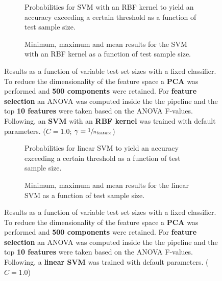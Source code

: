 \begin{figure}
    \captionsetup[subfigure]{justification=justified,singlelinecheck=false}
    \begin{subfigure}[t]{0.61\textwidth}
        
        \caption{Probabilities for SVM with an RBF kernel to yield an accuracy exceeding a certain threshold as a function of test sample size.}
    \end{subfigure}
    \hspace{3.0mm}
    \begin{subfigure}[t]{0.34\textwidth}
        
        \caption{Minimum, maximum and mean results for the SVM with an RBF kernel as a function of test sample size.}
    \end{subfigure}
    \caption[Effects of varying test sample size. SVM (kernel = RBF); Preprocessing: PCA ($n_\text{components} = \num{500}$); ANOVA feature selection ($k_\text{best} = \num{10}$)]{Results as a function of variable test set sizes with a fixed classifier. To reduce the dimensionality of the feature space a \textbf{PCA} was performed and \textbf{500 components} were retained. For \textbf{feature selection} an ANOVA was computed inside the the pipeline and the top \textbf{10 features} were taken based on the ANOVA F-values. Following, an \textbf{{SVM}} with an \textbf{{RBF kernel}} was trained with default parameters. ($C=\num{1.0}$; $\gamma=\sfrac{1}{n_\text{feature}}$)}
    \label{fig:PCA_500_components_10_best_selected_SVC}
\end{figure}

\begin{figure}
    \captionsetup[subfigure]{justification=justified,singlelinecheck=false}
    \begin{subfigure}[t]{0.61\textwidth}
        
        \caption{Probabilities for linear SVM to yield an accuracy exceeding a certain threshold as a function of test sample size.}
    \end{subfigure}
    \hspace{3.0mm}
    \begin{subfigure}[t]{0.34\textwidth}
        
        \caption{Minimum, maximum and mean results for the linear SVM as a function of test sample size.}
    \end{subfigure}
    \caption[Effects of varying test sample size. Linear SVM; Preprocessing: PCA ($n_\text{components} = \num{500}$); ANOVA feature selection ($k_\text{best} = \num{10}$)]{Results as a function of variable test set sizes with a fixed classifier. To reduce the dimensionality of the feature space a \textbf{PCA} was performed and \textbf{500 components} were retained. For \textbf{feature selection} an ANOVA was computed inside the the pipeline and the top \textbf{10 features} were taken based on the ANOVA F-values. Following, a \textbf{{linear SVM}} was trained with default parameters. ($C=\num{1.0}$)}
    \label{fig:PCA_500_components_10_best_selected_LinearSVC}
\end{figure}

